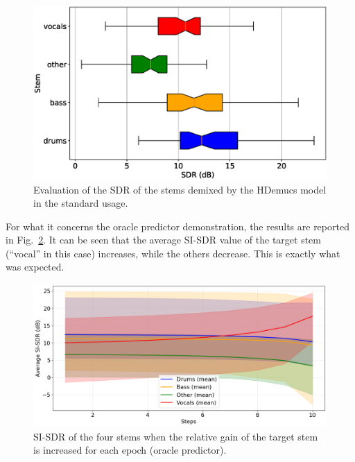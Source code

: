 \documentclass{article}
\begin{document}
\begin{sloppy}
\begin{figure}[t]
  \centering
  \centerline{\includegraphics[width=\columnwidth]{images/box_plot_sdr_results_sdr_results.eps}}
  \caption{Evaluation of the SDR of the stems demixed by the HDemucs model in the standard usage.}
  \label{fig:sdr_results}
\end{figure}

For what it concerns the oracle predictor demonstration, the results are reported in Fig.~\ref{fig:oracle_predictor}. It can be seen that the average SI-SDR value of the target stem (``vocal'' in this case) increases, while the others decrease. This is exactly what was expected.


\begin{figure}[t]
  \centering
  \centerline{\includegraphics[width=\columnwidth]{images/si_sdr_results_oracle_predictor.png}}
  \caption{
  SI-SDR of the four stems when the relative gain of the target stem is increased for each epoch (oracle predictor).}
  \label{fig:oracle_predictor}
\end{figure}


\end{sloppy}
\end{document}
